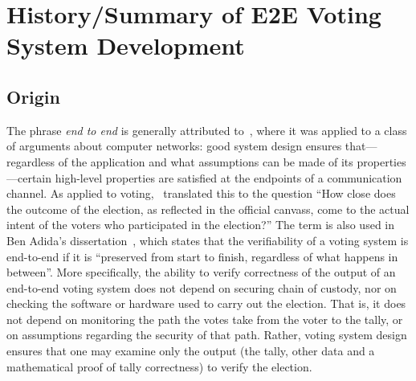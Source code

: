 \chapter{History/Summary of E2E Voting System Development}
\label{chapter:history}

\section{Origin}

The phrase \emph{end to end} is generally attributed to~\cite{saltzer1981},
where it was applied to a class of arguments about computer networks: good
system design ensures that---regardless of the application and what
assumptions can be made of its properties---certain high-level properties
are satisfied at the endpoints of a communication channel.  As applied to
voting, \cite{jones2002}~translated this to the question ``How close does the
outcome of the election, as reflected in the official canvass, come to the
actual intent of the voters who participated in the election?'' The term is
also used in Ben Adida's dissertation~\cite{adida2006}, which states that
the verifiability of a voting system is end-to-end if it is ``preserved from
start to finish, regardless of what happens in between''. More specifically,
the ability to verify correctness of the output of an end-to-end voting
system does not depend on securing chain of custody, nor on checking the
software or hardware used to carry out the election. That is, it does not
depend on monitoring the path the votes take from the voter to the tally, or
on assumptions regarding the security of that path. Rather, voting system
design ensures that one may examine only the output (the tally, other data
and a mathematical proof of tally correctness) to verify the election.

